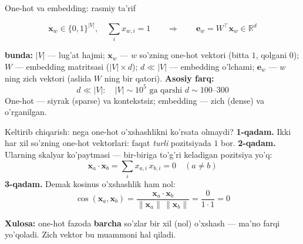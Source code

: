 \documentclass[aspectratio=169,11pt]{beamer}
\newcommand{\bunda}[1]{{\small\textbf{bunda:}\; #1}}
\begin{document}
\begin{frame}{One-hot va embedding: rasmiy ta'rif}
  \begin{tcolorbox}[defbox,title=Ta'rif: one-hot va zich embedding]
    \vspace{-0.4em}
    $$ \mathbf{x}_w \in \{0,1\}^{|V|},\quad \textstyle\sum_i x_{w,i}=1
       \qquad\Longrightarrow\qquad
       \mathbf{e}_w = W^\top \mathbf{x}_w \in \mathbb{R}^{d} $$
  \end{tcolorbox}
  \vspace{3pt}
  \bunda{$|V|$ --- lug'at hajmi; $\mathbf{x}_w$ --- $w$ so'zning one-hot vektori
  (bitta $1$, qolgani $0$); $W$ --- embedding matritsasi ($|V|\times d$);
  $d \ll |V|$ --- embedding o'lchami; $\mathbf{e}_w$ --- $w$ ning zich vektori
  (aslida $W$ ning bir qatori).}
  \vspace{5pt}
  \textbf{Asosiy farq:}
  $$ d \ll |V|: \quad |V|\!\sim\!10^5 \text{ ga qarshi } d\!\sim\!100\text{--}300 $$
  \footnotesize One-hot --- siyrak (sparse) va kontekstsiz; embedding --- zich
  (dense) va o'rganilgan.
\end{frame}

\begin{frame}{Keltirib chiqarish: nega one-hot o'xshashlikni ko'rsata olmaydi?}
  \textbf{1-qadam.} Ikki har xil so'zning one-hot vektorlari: faqat
  \emph{turli} pozitsiyada $1$ bor.
  \pause
  \textbf{2-qadam.} Ularning skalyar ko'paytmasi --- bir-biriga to'g'ri keladigan
  pozitsiya yo'q:
  $$ \mathbf{x}_a \cdot \mathbf{x}_b = \textstyle\sum_i x_{a,i}\,x_{b,i} = 0
     \quad (a \neq b) $$
  \pause
  \textbf{3-qadam.} Demak kosinus o'xshashlik ham nol:
  $$ \cos(\mathbf{x}_a,\mathbf{x}_b) = \frac{\mathbf{x}_a\cdot\mathbf{x}_b}
     {\|\mathbf{x}_a\|\,\|\mathbf{x}_b\|} = \frac{0}{1\cdot 1} = 0 $$
  \begin{tcolorbox}[okbox,top=2pt,bottom=2pt]
    \small \textbf{Xulosa:} one-hot fazoda \textbf{barcha} so'zlar bir xil
    (nol) o'xshash --- ma'no farqi yo'qoladi. Zich vektor bu muammoni hal qiladi.
  \end{tcolorbox}
\end{frame}
\end{document}
